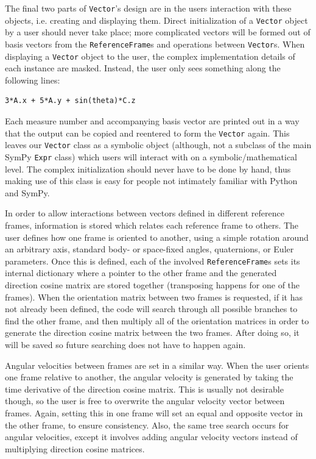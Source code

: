 \documentclass[twocolumn,10pt]{asme2e}
\begin{document}
The final two parts of \verb|Vector|'s design are in the users interaction with
these objects, i.e. creating and displaying them. Direct initialization of a
\verb|Vector| object by a user should never take place; more complicated
vectors will be formed out of basis vectors from the \verb|ReferenceFrame|s and
operations between \verb|Vector|s. When displaying a \verb|Vector| object to
the user, the complex implementation details of each instance are masked.
Instead, the user only sees something along the following lines:
\begin{verbatim}
3*A.x + 5*A.y + sin(theta)*C.z
\end{verbatim}
Each measure number and accompanying basis vector are printed out in a way that
the output can be copied and reentered to form the \verb|Vector| again.  This
leaves our \verb|Vector| class as a symbolic object (although, not a subclass
of the main SymPy \verb|Expr| class) which users will interact with on a
symbolic/mathematical level. The complex initialization should never have to be
done by hand, thus making use of this class is easy for people not intimately
familiar with Python and SymPy.

In order to allow interactions between vectors defined in different reference
frames, information is stored which relates each reference frame to others.
The user defines how one frame is oriented to another, using a simple rotation
around an arbitrary axis, standard body- or space-fixed angles, quaternions, or
Euler parameters. Once this is defined, each of the involved
\verb|ReferenceFrame|s sets its internal dictionary where a pointer to the
other frame and the generated direction cosine matrix are stored together
(transposing happens for one of the frames). When the orientation matrix
between two frames is requested, if it has not already been defined, the code
will search through all possible branches to find the other frame, and then
multiply all of the orientation matrices in order to generate the direction
cosine matrix between the two frames. After doing so, it will be saved so
future searching does not have to happen again.

Angular velocities between frames are set in a similar way.
When the user orients one frame relative to another, the angular velocity is
generated by taking the time derivative of the direction cosine matrix.
This is usually not desirable though, so the user is free to overwrite the
angular velocity vector between frames.
Again, setting this in one frame will set an equal and opposite vector in the
other frame, to ensure consistency.
Also, the same tree search occurs for angular velocities, except it involves
adding angular velocity vectors instead of multiplying direction cosine matrices.
\end{document}
